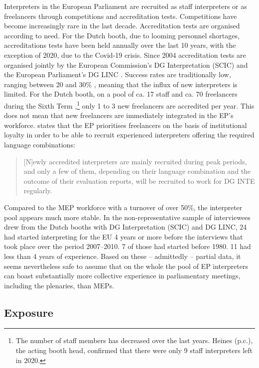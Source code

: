 \documentclass[output=paper]{langscibook}
\begin{document}
Interpreters in the European Parliament are recruited as staff interpreters or as freelancers through competitions and accreditation tests. Competitions have become increasingly rare in the last decade. Accreditation tests are organised according to need. For the Dutch booth, due to looming personnel shortages, accreditations tests have been held annually over the last 10 years, with the exception of 2020, due to the Covid-19 crisis. Since 2004 accreditation tests are organised jointly by the European Commission’s DG Interpretation (SCIC) and the European Parliament’s DG LINC \citep{Duflou2016}. Success rates are traditionally low, ranging between 20 and 30\% \citep{Duflou2016}, meaning that the influx of new interpreters is limited. For the Dutch booth, on a pool of ca. 17 staff and ca. 70 freelancers during the Sixth Term \citep{Duflou2016},\footnote{The number of staff members has decreased over the last years. Heines (p.c.), the acting booth head, confirmed that there were only 9 staff interpreters left in 2020.} only 1 to 3 new freelancers are accredited per year. This does not mean that new freelancers are immediately integrated in the EP’s workforce. \citet{Duflou2016} states that the EP prioritises freelancers on the basis of institutional loyalty in order to be able to recruit experienced interpreters offering the required language combinations: 

\begin{quote}
[N]ewly accredited interpreters are mainly recruited during peak periods, and only a few of them, depending on their language combination and the outcome of their evaluation reports, will be recruited to work for DG INTE regularly. \citep[145]{Duflou2016}
\end{quote}

Compared to the MEP workforce with a turnover of over 50\%, the interpreter pool appears much more stable. In the non-representative sample of interviewees \citet{Duflou2016} drew from the Dutch booths with DG Interpretation (SCIC) and DG LINC, 24 had started interpreting for the EU 4 years or more before the interviews that took place over the period 2007--2010. 7 of those had started before 1980. 11 had less than 4 years of experience. Based on these – admittedly – partial data, it seems nevertheless safe to assume that on the whole the pool of EP interpreters can boast substantially more collective experience in parliamentary meetings, including the plenaries, than MEPs.

\subsection{Exposure}\label{sec:defrancq:4.2}
\end{document}
